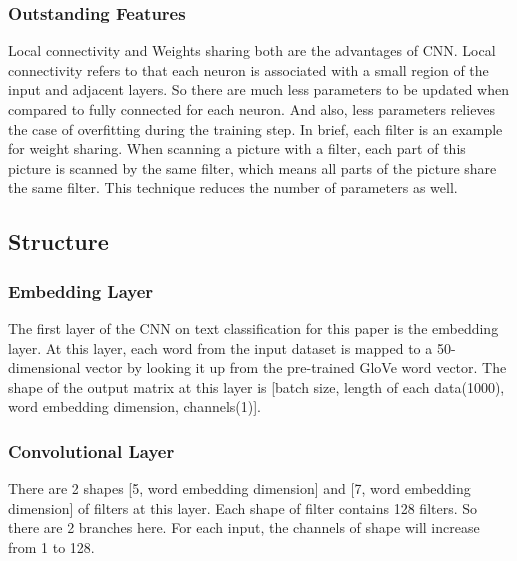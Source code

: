 \documentclass[12pt]{spieman}
\begin{document}
\begin{spacing}{1.5}
        \subsubsection{Outstanding Features}
        Local connectivity and Weights sharing both are the advantages of CNN. Local connectivity refers to that each neuron is associated with a small region of the input and adjacent layers. So there are much less parameters to be updated when compared to fully connected for each neuron. And also, less parameters relieves the case of overfitting during the training step.
        In brief, each filter is an example for weight sharing. When scanning a picture with a filter, each part of this picture is scanned by the same filter, which means all parts of the picture share the same filter. This technique reduces the number of parameters as well.

    \subsection{Structure}
        \subsubsection{Embedding Layer}
        The first layer of the CNN on text classification for this paper is the embedding layer. At this layer, each word from the input dataset is mapped to a 50-dimensional vector by looking it up from the pre-trained GloVe word vector. The shape of the output matrix at this layer is [batch size, length of each data(1000), word embedding dimension, channels(1)].
        \subsubsection{Convolutional Layer}
        There are 2 shapes [5, word embedding dimension]  and [7, word embedding dimension] of filters at this layer. Each shape of filter contains 128 filters. So there are 2 branches here. For each input, the channels of shape will increase from 1 to 128.

\end{spacing}
\end{document}
